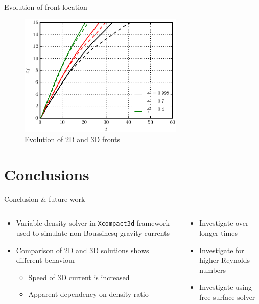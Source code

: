 \documentclass[presentation]{beamer}
\begin{document}
\begin{frame}[label={sec:orgc45dc6b}]{Evolution of front location}
\begin{figure}[htbp]
\centering
\includegraphics[width=0.7\textwidth]{./figures/2d3d_front_comparison.eps}
\caption{Evolution of 2D and 3D fronts}
\end{figure}
\end{frame}

\section{Conclusions}
\label{sec:org929b556}

\begin{frame}[label={sec:orgd0ca15b}]{Conclusion \& future work}
\begin{columns}
\begin{column}{0.5\columnwidth}
\begin{itemize}
\item Variable-density solver in \texttt{Xcompact3d} framework used to simulate non-Boussinesq gravity
currents
\item Comparison of 2D and 3D solutions shows different behaviour
\begin{itemize}
\item Speed of 3D current is increased
\item Apparent dependency on density ratio
\end{itemize}
\end{itemize}
\end{column}

\begin{column}{0.5\columnwidth}
\begin{itemize}
\item Investigate over longer times
\item Investigate for higher Reynolds numbers
\item Investigate using free surface solver
\end{itemize}
\end{column}
\end{columns}
\end{frame}
\end{document}
